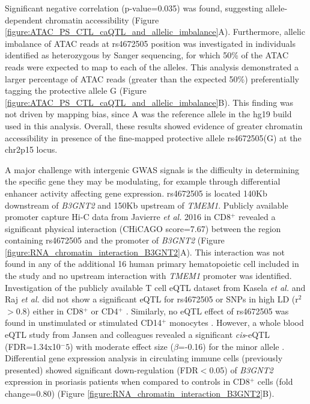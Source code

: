 Significant negative correlation (p-value=0.035) was found, suggesting allele-dependent chromatin accessibility (Figure \ref{figure:ATAC_PS_CTL_caQTL_and_allelic_imbalance}A). Furthermore, allelic imbalance of ATAC reads at rs4672505 position was investigated in individuals identified as heterozygous by Sanger sequencing, for which 50\% of the ATAC reads were expected to map to each of the alleles. This analysis demonstrated a larger percentage of ATAC reads (greater than the expected 50\%) preferentially tagging the protective allele G (Figure \ref{figure:ATAC_PS_CTL_caQTL_and_allelic_imbalance}B). This finding was not driven by mapping bias, since A was the reference allele in the hg19 build used in this analysis. Overall, these results showed evidence of greater chromatin accessibility in presence of the fine-mapped protective allele rs4672505(G) at the chr2p15 locus.
 

A major challenge with intergenic GWAS signals is the difficulty in determining the specific gene they may be modulating, for example through differential enhancer activity affecting gene expression. rs4672505 is located 140Kb downstream of \textit{B3GNT2} and 150Kb upstream of \textit{TMEM1}. Publicly available promoter capture Hi-C data from Javierre \textit{et al.} 2016 in CD8$^+$ revealed a significant physical interaction (CHiCAGO score=7.67) between the region containing rs4672505 and the promoter of \textit{B3GNT2} (Figure \ref{figure:RNA_chromatin_interaction_B3GNT2}A). This interaction was not found in any of the additional 16 human primary hematopoietic cell included in the study and no upstream interaction with \textit{TMEM1} promoter was identified. Investigation of the publicly available T cell eQTL dataset from Kasela \textit{et al.} and Raj \textit{et al.} did not show a significant eQTL for rs4672505 or SNPs in high LD (r$^2$$>$0.8) either in CD8$^+$ or CD4$^+$ \parencite{Raj2014,Kasela2017}. Similarly, no eQTL effect of rs4672505 was found in unstimulated or stimulated CD14$^+$ monocytes \parencite{Fairfax2014}. However, a whole blood eQTL study from Jansen and colleagues revealed a significant \textit{cis}-eQTL (FDR=1.34x10$^-5$) with moderate effect size ($\beta$=-0.16) for the minor allele \parencite{Jansen2017}. Differential gene expression analysis in circulating immune cells (previously presented) showed significant down-regulation (FDR$<$0.05) of \textit{B3GNT2} expression in psoriasis patients when compared to controls in CD8$^+$ cells (fold change=0.80) (Figure \ref{figure:RNA_chromatin_interaction_B3GNT2}B). 


